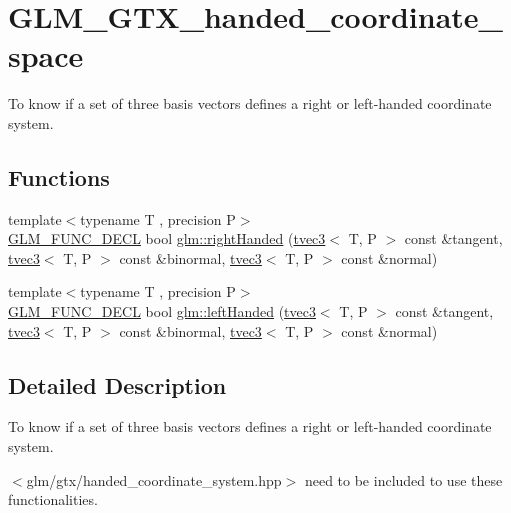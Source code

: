 \hypertarget{group__gtx__handed__coordinate__space}{}\section{G\+L\+M\+\_\+\+G\+T\+X\+\_\+handed\+\_\+coordinate\+\_\+space}
\label{group__gtx__handed__coordinate__space}


To know if a set of three basis vectors defines a right or left-\/handed coordinate system.  


\subsection*{Functions}
\begin{DoxyCompactItemize}
\item 
{\footnotesize template$<$typename T , precision P$>$ }\\\mbox{\hyperlink{setup_8hpp_ab2d052de21a70539923e9bcbf6e83a51}{G\+L\+M\+\_\+\+F\+U\+N\+C\+\_\+\+D\+E\+CL}} bool \mbox{\hyperlink{group__gtx__handed__coordinate__space_ga17cd83888de8755c0435c589fafd3603}{glm\+::right\+Handed}} (\mbox{\hyperlink{structglm_1_1tvec3}{tvec3}}$<$ T, P $>$ const \&tangent, \mbox{\hyperlink{structglm_1_1tvec3}{tvec3}}$<$ T, P $>$ const \&binormal, \mbox{\hyperlink{structglm_1_1tvec3}{tvec3}}$<$ T, P $>$ const \&normal)
\item 
{\footnotesize template$<$typename T , precision P$>$ }\\\mbox{\hyperlink{setup_8hpp_ab2d052de21a70539923e9bcbf6e83a51}{G\+L\+M\+\_\+\+F\+U\+N\+C\+\_\+\+D\+E\+CL}} bool \mbox{\hyperlink{group__gtx__handed__coordinate__space_ga7425e0ebfe6a56919900a072ae1f8017}{glm\+::left\+Handed}} (\mbox{\hyperlink{structglm_1_1tvec3}{tvec3}}$<$ T, P $>$ const \&tangent, \mbox{\hyperlink{structglm_1_1tvec3}{tvec3}}$<$ T, P $>$ const \&binormal, \mbox{\hyperlink{structglm_1_1tvec3}{tvec3}}$<$ T, P $>$ const \&normal)
\end{DoxyCompactItemize}


\subsection{Detailed Description}
To know if a set of three basis vectors defines a right or left-\/handed coordinate system. 

$<$glm/gtx/handed\+\_\+coordinate\+\_\+system.\+hpp$>$ need to be included to use these functionalities. 

